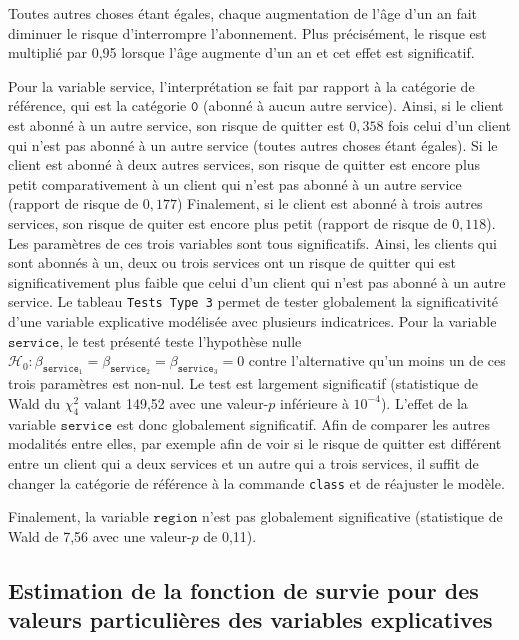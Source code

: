\documentclass[
  11pt,
  letterpaper,
]{book}
\theoremstyle{definition}
\theoremstyle{definition}
\theoremstyle{definition}
\theoremstyle{remark}
\begin{document}
Toutes autres choses étant égales, chaque augmentation de l'âge d'un an fait diminuer le risque d'interrompre l'abonnement. Plus précisément, le risque est multiplié par 0,95 lorsque l'âge augmente d'un an et cet effet est significatif.

Pour la variable service, l'interprétation se fait par rapport à la catégorie de référence, qui est la catégorie \(\texttt{0}\) (abonné à aucun autre service). Ainsi, si le client est abonné à un autre service, son risque de quitter est \(0,358\) fois celui d'un client qui n'est pas abonné à un autre service (toutes autres choses étant égales). Si le client est abonné à deux autres services, son risque de quitter est encore plus petit comparativement à un client qui n'est pas abonné à un autre service (rapport de risque de \(0,177\)) Finalement, si le client est abonné à trois autres services, son risque de quiter est encore plus petit (rapport de risque de \(0,118\)). Les paramètres de ces trois variables sont tous significatifs. Ainsi, les clients qui sont abonnés à un, deux ou trois services ont un risque de quitter qui est significativement plus faible que celui d'un client qui n'est pas abonné à un autre service. Le tableau \texttt{Tests\ Type\ 3} permet de tester globalement la significativité d'une variable explicative modélisée avec plusieurs indicatrices. Pour la variable \(\texttt{service}\), le test présenté teste l'hypothèse nulle \(\mathcal{H}_0: \beta_{\texttt{service}_1}=\beta_{\texttt{service}_2}=\beta_{\texttt{service}_3}=0\) contre l'alternative qu'un moins un de ces trois paramètres est non-nul. Le test est largement significatif (statistique de Wald du \(\chi^2_4\) valant 149,52 avec une valeur-\(p\) inférieure à \(10^{-4}\)). L'effet de la variable \(\texttt{service}\) est donc globalement significatif. Afin de comparer les autres modalités entre elles, par exemple afin de voir si le risque de quitter est différent entre un client qui a deux services et un autre qui a trois services, il suffit de changer la catégorie de référence à la commande \texttt{class} et de réajuster le modèle.

Finalement, la variable \(\texttt{region}\) n'est pas globalement significative (statistique de Wald de 7,56 avec une valeur-\(p\) de 0,11).

\hypertarget{estimation-de-la-fonction-de-survie-pour-des-valeurs-particuliuxe8res-des-variables-explicatives}{%
\subsection{Estimation de la fonction de survie pour des valeurs particulières des variables explicatives}\label{estimation-de-la-fonction-de-survie-pour-des-valeurs-particuliuxe8res-des-variables-explicatives}}
\end{document}
